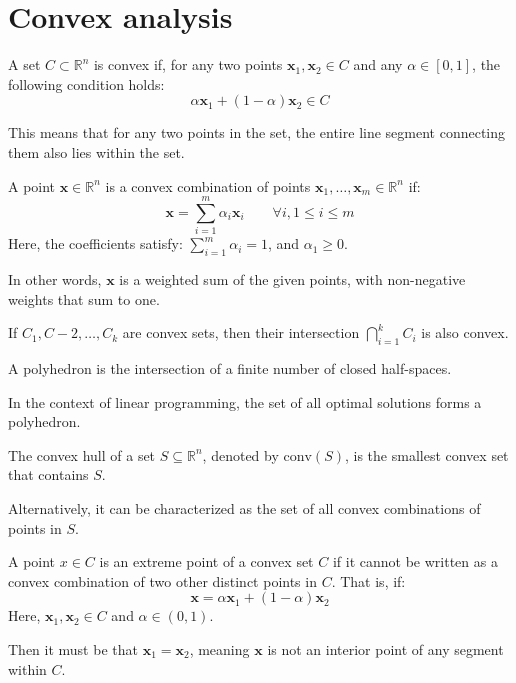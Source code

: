 \section{Convex analysis}

\begin{definition}
    A set $C\subset\mathbb{R}^n$ is convex if, for any two points $\mathbf{x}_1, \mathbf{x}_2 \in C$ and any $\alpha\in [0, 1]$, the following condition holds:
    \[\alpha \mathbf{x}_1 + (1 - \alpha )\mathbf{x}_2 \in C\]
\end{definition}
\noindent This means that for any two points in the set, the entire line segment connecting them also lies within the set.

\begin{definition}
    A point $\mathbf{x}\in\mathbb{R}^n$ is a convex combination of points $\mathbf{x}_1,\dots,\mathbf{x}_m\in\mathbb{R}^n$ if:
    \[\mathbf{x}=\sum_{i=1}^{m}\alpha_i\mathbf{x}_i\qquad\forall i, 1\leq i \leq m\]
    Here, the coefficients satisfy: $\sum_{i=1}^m\alpha_i=1$, and $\alpha_1\geq 0$.
\end{definition}
\noindent In other words, $\mathbf{x}$ is a weighted sum of the given points, with non-negative weights that sum to one.

\begin{property}
    If $C_1,C-2,\dots,C_k$ are convex sets, then their intersection $\bigcap_{i=1}^{k}C_i$ is also convex.
\end{property}

\begin{definition}
    A polyhedron is the intersection of a finite number of closed half-spaces.
\end{definition}
\noindent In the context of linear programming, the set of all optimal solutions forms a polyhedron.

\begin{definition}
    The convex hull of a set $S \subseteq \mathbb{R}^n$, denoted by $\text{conv}(S)$, is the smallest convex set that contains $S$.
\end{definition}
\noindent Alternatively, it can be characterized as the set of all convex combinations of points in $S$.

\begin{definition}
    A point $x \in  C$ is an extreme point of a convex set $C$ if it cannot be written as a convex combination of two other distinct points in $C$.
    That is, if:
    \[\mathbf{x} = \alpha \mathbf{x}_1 + (1 - \alpha )\mathbf{x}_2\]
    Here, $\mathbf{x}_1,\mathbf{x}_2\in  C$ and $\alpha\in (0, 1)$.
\end{definition}
\noindent Then it must be that $\mathbf{x}_1 = \mathbf{x}_2$, meaning $\mathbf{x}$ is not an interior point of any segment within $C$.

